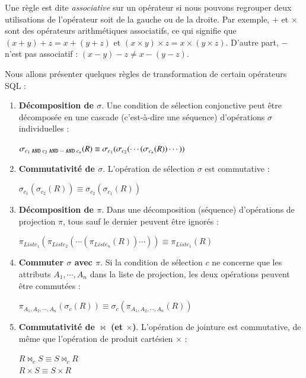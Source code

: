 Une règle est dite \textit{associative} sur un opérateur si nous pouvons regrouper deux utilisations de l'opérateur soit de la gauche ou de la droite. Par exemple, $+$ et $\times$ sont des opérateurs arithmétiques associatifs, ce qui signifie que $(x + y) + z = x + (y + z)$ et $(x \times y) \times z = x \times (y \times z)$. D'autre part, $-$ n'est pas associatif : $(x - y) - z \neq x - (y - z)$.

Nous allons présenter quelques règles de transformation de certain opérateurs SQL \cite{Freytag87, Elmasri08, GarciaMolina08}:

\begin{enumerate}
 \item \textbf{Décomposition de $\sigma$}. Une condition de sélection conjonctive peut être décomposée en une cascade (c'est-à-dire une séquence) d'opérations $\sigma$ individuelles :
 
 $\sigma_{c_1 \; \text{\texttt{AND}} \; c_2 \; \text{\texttt{AND}} \; \cdots \; \text{\texttt{AND}} \; c_n} (R) \equiv \sigma_{c_1} (\sigma_{c_2} (\cdots(\sigma_{c_n} (R))\cdots))$
 
 \item \textbf{Commutativité de $\sigma$}. L'opération de sélection $\sigma$ est commutative :
 
 $\sigma_{c_1} (\sigma_{c_2} (R)) \equiv \sigma_{c_2} (\sigma_{c_1} (R))$
 
 \item \textbf{Décomposition de $\pi$}. Dans une décomposition (séquence) d'opérations de projection $\pi$, tous sauf le dernier peuvent être ignorés :
 
 $\pi_{Liste_1}  (\pi_{Liste_2}  (\cdots(\pi_{Liste_n} (R))\cdots)) \equiv \pi_{Liste_1}(R)$
 
 \item \textbf{Commuter $\sigma$ avec $\pi$}. Si la condition de sélection $c$ ne concerne que les attributs $A_1, \cdots, A_n$ dans la liste de projection, les deux opérations peuvent être commutées :
 
 $\pi_{A_1, A_2, \cdots, A_n} (\sigma_c (R)) \equiv \sigma_c (\pi_{A_1, A_2, \cdots, A_n} (R))$
 
 \item \textbf{Commutativité de $\bowtie$ (et $\times$)}. L'opération de jointure est commutative, de même que l'opération de produit cartésien $\times$ :
 
 $R \bowtie_c S \equiv S \bowtie_c R$\\
 $R \times S \equiv S \times R$
 

\end{enumerate}
